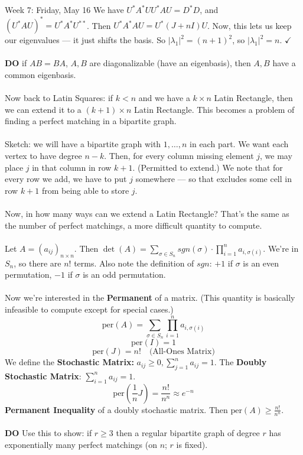 \documentclass[12pt]{article}
\theoremstyle{remark}
\newcommand{\per}{\mathrm{per}}
\begin{document}
\begin{section}{Week 7: Friday, May 16}
We have $U^*A^*UU^*AU = D^*D$, and $(U^*AU)^* = U^*A^*U^{**}$. Then $U^*A^*AU = U^*(J+nI)U$. Now, this lets us keep our eigenvalues --- it just shifts the basis. So $|\lambda_1|^2 = (n+1)^2$, so $|\lambda_1|^2 = n$. $\checkmark$
\\\\
\textbf{DO} if $AB=BA$, $A,B$ are diagonalizable (have an eigenbasis), then $A,B$ have a common eigenbasis.
\\\\
Now back to Latin Squares: if $k < n$ and we have a $k \times n$ Latin Rectangle, then we can extend it to a $(k+1) \times n$ Latin Rectangle. This becomes a problem of finding a perfect matching in a bipartite graph. 
\\\\
Sketch:  we will have a bipartite graph with $1,\ldots,n$ in each part. We want each vertex to have degree $n-k$. Then, for every column missing element $j$, we may place $j$ in that column in row $k+1$. (Permitted to extend.) We note that for every row we add, we have to put $j$ somewhere --- so that excludes some cell in row $k+1$ from being able to store $j$.
\\\\
Now, in how many ways can we extend a Latin Rectangle? That's the same as the number of perfect matchings, a more difficult quantity to compute. 
\\\\
Let $A = (a_{ij})_{n \times n}$. Then $\det(A) = \sum_{\sigma \in S_n} sgn(\sigma) \cdot \prod_{i=1}^{n} a_{i,\sigma(i)}$. We're in $S_n$, so there are $n!$ terms. Also note the definition of $sgn$: $+1$ if $\sigma$ is an even permutation, $-1$ if $\sigma$ is an odd permutation.
\\\\
Now we're interested in the \textbf{Permanent} of a matrix. (This quantity is basically infeasible to compute except for special cases.)
$$\per(A) = \sum_{\sigma \in S_n} \prod_{i=1}^n a_{i,\sigma(i)}$$
$$\per(I) = 1$$
$$\per(J) = n! \quad \text{(All-Ones Matrix)}$$
We define the \textbf{Stochastic Matrix:} $a_{ij} \geq 0, \sum_{j=1}^n a_{ij} = 1$. The \textbf{Doubly Stochastic Matrix}: $\sum_{i=1}^n a_{ij} = 1$.
$$\per(\frac 1 n J ) = \frac {n!}{n^n} \approx e^{-n}$$
\textbf{Permanent Inequality} of a doubly stochastic matrix.
Then $\per(A) \geq \frac{n!}{n^n}$.
\\\\
\textbf{DO} Use this to show: if $r \geq 3$ then a regular bipartite graph of degree $r$ has exponentially many perfect matchings (on $n$; $r$ is fixed). 
\\\\
\end{section}
\end{document}
